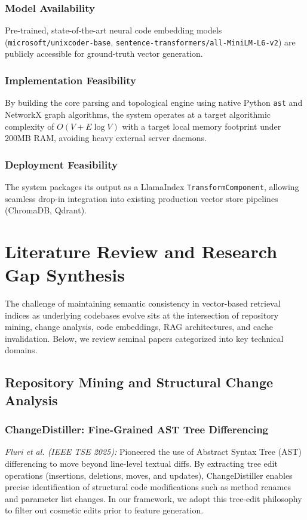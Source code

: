\documentclass[conference]{IEEEtran}
\begin{document}
\subsubsection{Model Availability}
Pre-trained, state-of-the-art neural code embedding models (\texttt{microsoft/unixcoder-base}, \texttt{sentence-transformers/all-MiniLM-L6-v2}) are publicly accessible for ground-truth vector generation.

\subsubsection{Implementation Feasibility}
By building the core parsing and topological engine using native Python \texttt{ast} and NetworkX graph algorithms, the system operates at a target algorithmic complexity of $O(V + E \log V)$ with a target local memory footprint under $200\text{MB}$ RAM, avoiding heavy external server daemons.

\subsubsection{Deployment Feasibility}
The system packages its output as a LlamaIndex \texttt{TransformComponent}, allowing seamless drop-in integration into existing production vector store pipelines (ChromaDB, Qdrant).

\section{Literature Review and Research Gap Synthesis}
The challenge of maintaining semantic consistency in vector-based retrieval indices as underlying codebases evolve sits at the intersection of repository mining, change analysis, code embeddings, RAG architectures, and cache invalidation. Below, we review seminal papers categorized into key technical domains.

\subsection{Repository Mining and Structural Change Analysis}

\subsubsection{ChangeDistiller: Fine-Grained AST Tree Differencing}
\emph{Fluri et al. \cite{Fluri2025} (IEEE TSE 2025):} Pioneered the use of Abstract Syntax Tree (AST) differencing to move beyond line-level textual diffs. By extracting tree edit operations (insertions, deletions, moves, and updates), ChangeDistiller enables precise identification of structural code modifications such as method renames and parameter list changes. In our framework, we adopt this tree-edit philosophy to filter out cosmetic edits prior to feature generation.
\end{document}
